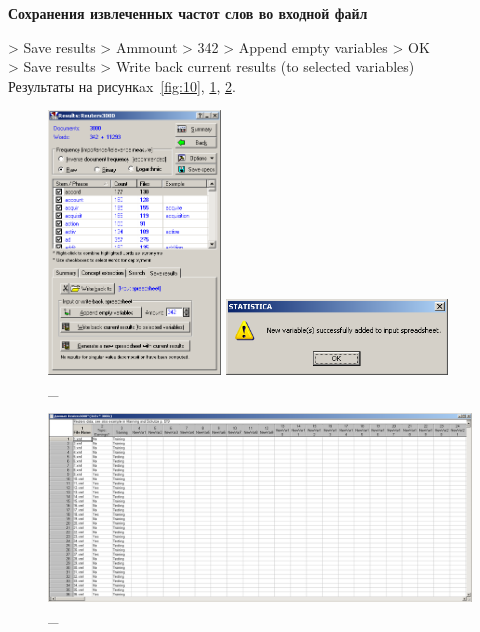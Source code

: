 \begin{center}
  \textbf{Сохранения извлеченных частот слов во входной файл}
\end{center}

> Save results > Ammount > 342 > Append empty variables > OK \\
> Save results > Write back current results (to selected variables) \\

Результаты на рисункax~\ref{fig:10}, \ref{fig:11}, \ref{fig:12}.

\begin{figure}[!h]
  \centering

  \begin{minipage}{0.49\textwidth}
    \centering

    \includegraphics[height=7cm]
    {inc/10.PNG}

    \caption{\_}

    \label{fig:10}
  \end{minipage}
  \begin{minipage}{0.49\textwidth}
    \centering

    \includegraphics[height=2cm]
    {inc/11.PNG}

    \caption{\_}

    \label{fig:11}
  \end{minipage}
\end{figure}

\begin{figure}[p!h]
  \centering

  \includegraphics[width=17cm]
  {inc/12.PNG}

  \caption{\_}

  \label{fig:12}
\end{figure}

